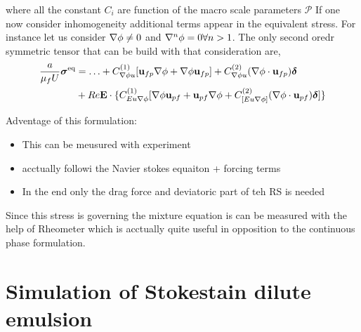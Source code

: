 where all the constant $C_i$ are function of the macro scale parameters $\mathcal{P}$
If one now consider inhomogeneity additional terms appear in the equivalent stress.  
For instance let us consider $\mathbf{\nabla} \phi \neq 0$ and $\mathbf{\nabla}^n \phi = 0 \forall n >1$. 
The only second oredr symmetric tensor that can be build with that consideration are, 
\begin{align}
    \frac{a}{\mu_f U}\bm\sigma^\text{eq} &= 
    \ldots 
    +  
    C_{\mathbf{\nabla} \phi u}^{(1)}[\textbf{u}_{fp}
    \mathbf{\nabla} \phi 
    + 
    \mathbf{\nabla} \phi 
    \textbf{u}_{fp}]
    +C_{\mathbf{\nabla} \phi u}^{(2)} (\mathbf{\nabla} \phi \cdot 
    \textbf{u}_{fp})\bm\delta \\
    &+Re \textbf{E}\cdot\{ C_{Eu \mathbf{\nabla} \phi}^{(1)} [\mathbf{\nabla} \phi \textbf{u}_{pf}+  \textbf{u}_{pf} \mathbf{\nabla} \phi + C_{[Eu\mathbf{\nabla}\phi]}^{(2)}(\mathbf{\nabla} \phi\cdot  \textbf{u}_{pf})\bm\delta]\}
\end{align}


Adventage of this formulation: 
\begin{itemize}
    \item This can be meusured with experiment
    \item acctually followi the Navier stokes equaiton + forcing terms 
    \item In the end only the drag force and deviatoric part of teh RS is needed 
\end{itemize}
Since this stress is governing the mixture equation is can be measured with the help of Rheometer which is acctually quite useful in opposition to the continuous phase formulation. 

\section{Simulation of Stokestain  dilute emulsion}

